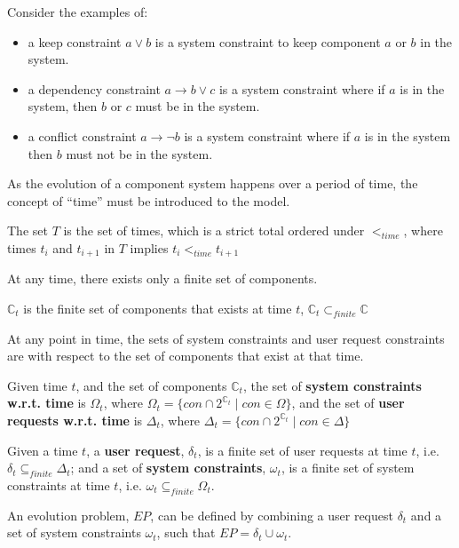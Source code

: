 Consider the examples of:
\begin{itemize}
  \item a keep constraint $a \vee b$ is a system constraint to keep component $a$ or $b$ in the system.
  \item a dependency constraint $a \rightarrow b \vee c$ is a system constraint where if $a$ is in the system, then $b$ or $c$ must be in the system.
  \item a conflict constraint $a \rightarrow \neg b$ is a system constraint where if $a$ is in the system then $b$ must not be in the system.
\end{itemize} 

As the evolution of a component system happens over a period of time, the concept of ``time'' must be introduced to the model.
\begin{defs}
The set $T$ is the set of times, which is a strict total ordered under $<_{time}$, where times $t_i$ and $t_{i+1}$ in $T$ implies $t_i <_{time} t_{i+1}$
\end{defs}

At any time, there exists only a finite set of components. 
\begin{defs}
$\mathbb{C}_{t}$ is the finite set of components that exists at time $t$, $\mathbb{C}_{t} \subset_{finite} \mathbb{C}$
\end{defs}

At any point in time, the sets of system constraints and user request constraints are with respect to the set of components that exist at that time.
\begin{defs}
Given time $t$, and the set of components $\mathbb{C}_{t}$, the set of \textbf{system constraints w.r.t. time} is $\Omega_{t}$, where $\Omega_{t} = \{con \cap 2^{\mathbb{C}_{t}} \mid con \in \Omega\}$,
and the set of \textbf{user requests w.r.t. time} is $\Delta_{t}$, where $\Delta_{t} = \{con \cap 2^{\mathbb{C}_{t}} \mid con \in \Delta\}$
\end{defs}

\begin{defs}
Given a time $t$, a \textbf{user request}, $\delta_{t}$, is a finite set of user requests at time $t$, i.e. $\delta_{t} \subseteq_{finite} \Delta_{t}$;
and a set of \textbf{system constraints}, $\omega_{t}$, is a finite set of system constraints at time $t$, i.e. $\omega_{t} \subseteq_{finite} \Omega_{t}$.  
\end{defs}

An evolution problem, $EP$, can be defined by combining a user request $\delta_{t}$ and a set of system constraints $\omega_{t}$, such that $EP = \delta_{t} \cup \omega_{t}$.


